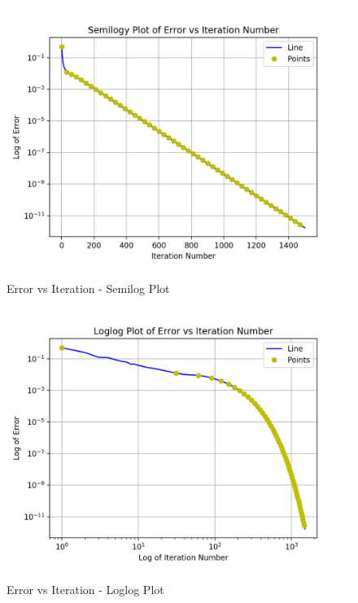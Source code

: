 \documentclass[11pt, a4paper]{article}
\begin{document}
\begin{figure}[H]
   	\centering
   	\includegraphics[scale=0.5]{semilog_pt.png}
   	\label{fig:semilog_pt}
   	\caption{Error vs Iteration - Semilog Plot}
\end{figure}
\begin{figure}[H]
   	\centering
   	\includegraphics[scale=0.5]{loglog_pt.png}
   	\label{fig:loglog_pt}
   	\caption{Error vs Iteration - Loglog Plot}
\end{figure}
   
\end{document}

